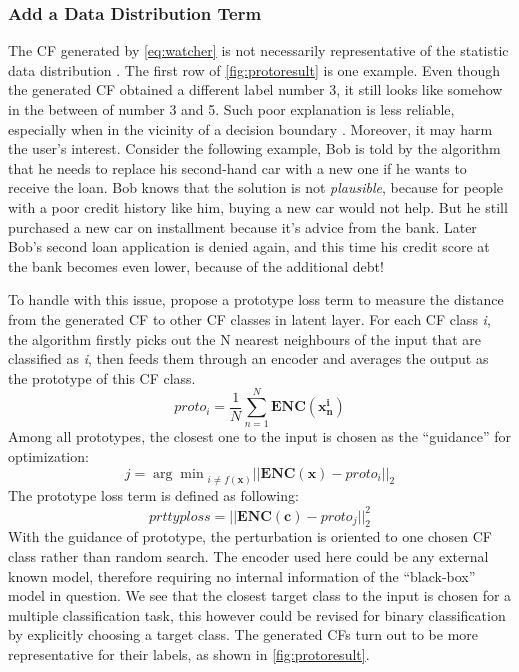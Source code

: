 \subsubsection{Add a Data Distribution Term}
The CF generated by \autoref{eq:watcher} is not necessarily representative of the statistic data distribution \cite{FACE}. The first row of \autoref{fig:protoresult} is one example. Even though the generated CF obtained a different label number 3, it still looks like somehow in the between of number 3 and 5. Such poor explanation is less reliable, especially when in the vicinity of a decision boundary \cite{FACE}. Moreover, it may harm the user's interest. Consider the following example, Bob is told by the algorithm that he needs to replace his second-hand car with a new one if he wants to receive the loan. Bob knows that the solution is not \emph{plausible}, because for people with a poor credit history like him, buying a new car would not help. But he still purchased a new car on installment because it's advice from the bank. Later Bob's second loan application is denied again, and this time his credit score at the bank becomes even lower, because of the additional debt!

To handle with this issue, \citeauthor{prototype} \cite{prototype} propose a prototype loss term to measure the distance from the generated CF to other CF classes in latent layer. For each CF class \emph{i}, the algorithm firstly picks out the N nearest neighbours of the input that are classified as \emph{i}, then feeds them through an encoder and averages the output as the prototype of this CF class.
\begin{equation}\label{eq:prototype}
  proto_i=\frac{1}{N}\sum_{n=1}^{N}\mathbf{ENC}(\mathbf{x_n^i})
\end{equation}
Among all prototypes, the closest one to the input is chosen as the ``guidance'' for optimization:
\begin{equation}\label{eq:closestProto}
  j = {\arg\min}_{i\neq f(\textbf{x})}||\mathbf{ENC}(\textbf{x})-proto_i||_2
\end{equation}
The prototype loss term is defined as following:
\begin{equation}\label{eq:protoloss}
  prttyploss=||\mathbf{ENC}(\textbf{c})-proto_j||_2^2
\end{equation}
With the guidance of prototype, the perturbation is oriented to one chosen CF class rather than random search. The encoder used here could be any external known model, therefore requiring no internal information of the ``black-box'' model in question. We see that the closest target class to the input is chosen for a multiple classification task, this however could be revised for binary classification by explicitly choosing a target class. The generated CFs turn out to be more representative for their labels, as shown in \autoref{fig:protoresult}.

